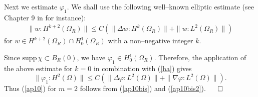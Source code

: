 \documentclass[12pt]{amsart}
\numberwithin{equation}{section}
\begin{document}
Next we estimate $\varphi_1$.
We shall use the following well--known elliptic estimate
(see Chapter 9 in \cite{GiTr} for instance):
\begin{eqnarray}\nonumber
 \|w\!:\!{H^{k+2}(\Omega_R)}\| \le
C(\|\Delta w\!:\!{H^k(\Omega_R)}\| 
  +\|w\!:\!{L^2(\Omega_R)}\|)
\end{eqnarray}
for $w \in H^{k+2}(\Omega_R) \cap H^1_0(\Omega_R)$ with a non--negative integer $k$.

Since $\text{supp}\,\chi \subset B_R(0)$, we have $\varphi_1 \in H_0^1(\Omega_R)$.
Therefore, the application of the above estimate for $k=0$ in 
combination with (\ref{ha}) gives
\begin{equation}\label{ap10bis2}
 \| \varphi_1\!:\!{H^2(\Omega)}\| \le
C(\|\Delta \varphi\!:\!{L^2(\Omega)}\| 
  +\|\nabla \varphi\!:\!{L^2(\Omega)}\|).
\end{equation}
Thus (\ref{ap10}) for $m=2$ follows from (\ref{ap10bis}) and (\ref{ap10bis2}). 
\hfill$\qed$

\vspace{2mm}
\end{document}
